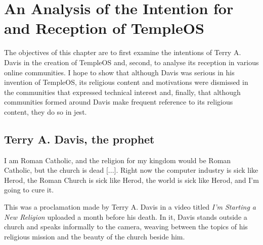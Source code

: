 \documentclass[Draft.tex]{subfiles}
\begin{document}
\chapter{An Analysis of the Intention for and Reception of TempleOS}

The objectives of this chapter are to first examine
the intentions of Terry A. Davis in the creation of TempleOS and, second,
to analyse its reception in various online communities.
I hope to show that although Davis was serious in his invention of TempleOS,
its religious content and motivations were dismissed
in the communities that expressed technical interest and, finally,
that although communities formed around Davis make frequent reference
to its religious content, they do so in jest.

\section*{Terry A. Davis, the prophet}

\begin{displayquote}
  I am Roman Catholic, and the religion for my kingdom
  would be Roman Catholic, but the church is dead [...].
  Right now the computer industry is sick like Herod,
  the Roman Church is sick like Herod,
  the world is sick like Herod, and I'm going to cure it.
\end{displayquote}

This was a proclamation made by Terry A. Davis \parencite*{NewReligionVid}
in a video titled \textit{I'm Starting a New Religion}
uploaded a month before his death.
In it, Davis stands outside a church and speaks informally to the camera,
weaving between the topics of his religious mission
and the beauty of the church beside him.
\end{document}
